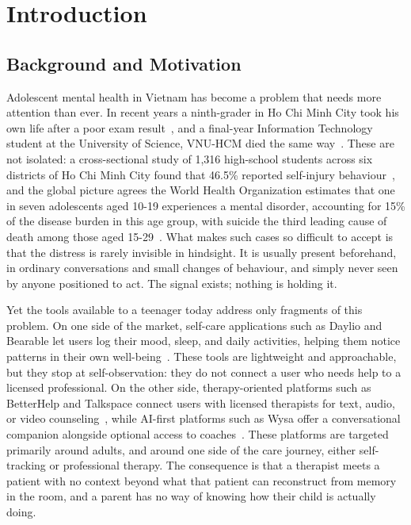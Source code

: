 \chapter{Introduction}
\label{Chapter1}

\section{Background and Motivation}

Adolescent mental health in Vietnam has become a problem that needs more attention than ever. In recent years a ninth-grader in Ho Chi Minh City took his own
life after a poor exam result~\cite{DanTri2017}, and a final-year Information
Technology student at the University of Science, VNU-HCM died the same way~\cite{TuoiTre2024}. These are not isolated: a cross-sectional
study of 1{,}316 high-school students across six districts of Ho Chi Minh City
found that 46.5\% reported self-injury behaviour~\cite{PhamThao2019}, and the
global picture agrees the World Health Organization estimates that one in
seven adolescents aged 10-19 experiences a mental disorder, accounting for 15\%
of the disease burden in this age group, with suicide the third leading cause of
death among those aged 15-29~\cite{WHO_AdolescentMH}. What makes such cases so
difficult to accept is that the distress is rarely invisible in hindsight. It is
usually present beforehand, in ordinary conversations and small changes of
behaviour, and simply never seen by anyone positioned to act. The signal exists;
nothing is holding it.

Yet the tools available to a teenager today address only fragments of this
problem. On one side of the market, self-care applications such as Daylio and
Bearable let users log their mood, sleep, and daily activities, helping them
notice patterns in their own well-being~\cite{Daylio, Bearable}. These tools are
lightweight and approachable, but they stop at self-observation: they do not
connect a user who needs help to a licensed professional. On the other side,
therapy-oriented platforms such as BetterHelp and Talkspace connect users with
licensed therapists for text, audio, or video counseling~\cite{BetterHelp,
Talkspace}, while AI-first platforms such as Wysa offer a conversational
companion alongside optional access to coaches~\cite{Wysa}. These platforms are
targeted primarily around adults, and around one side of the care
journey, either self-tracking or professional therapy.
The consequence is that a therapist meets a patient with no context beyond what
that patient can reconstruct from memory in the room, and a parent has no way of
knowing how their child is actually doing.

